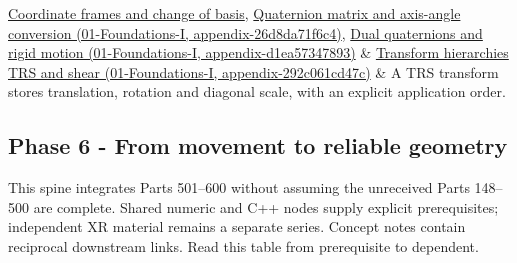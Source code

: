 {\begin{longtable}[]
\hyperref[appendix-1bae9457dbc3]{Coordinate frames and change of basis}, \href{../01-Foundations-I/main.pdf\#nameddest=appendix-26d8da71f6c4}{Quaternion matrix and axis-angle conversion (01-Foundations-I, appendix-26d8da71f6c4)}, \href{../01-Foundations-I/main.pdf\#nameddest=appendix-d1ea57347893}{Dual quaternions and rigid motion (01-Foundations-I, appendix-d1ea57347893)} & \href{../01-Foundations-I/main.pdf\#nameddest=appendix-292c061cd47c}{Transform hierarchies TRS and shear (01-Foundations-I, appendix-292c061cd47c)} & A TRS transform stores translation, rotation and diagonal scale, with an explicit application order. \\
\end{longtable}
}

\subsection{Phase 6 - From movement to reliable geometry}\label{appendix-4ad47bdd269a-phase-6---from-movement-to-reliable-geometry}

This spine integrates Parts 501--600 without assuming the unreceived Parts 148--500 are complete. Shared numeric and C++ nodes supply explicit prerequisites; independent XR material remains a separate series. Concept notes contain reciprocal downstream links. Read this table from prerequisite to dependent.

